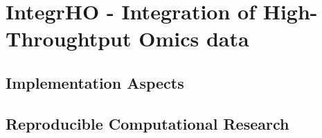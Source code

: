 \documentclass[b5paper,oneside,british,intoc,bibliograph=totoc,index=totoc,BCOR10mm,twoside,openright]{book}
\numberwithin{equation}{section}
\numberwithin{figure}{section}
\begin{document}
\chapter{IntegrHO - Integration of High-Throughtput Omics data} \label{sec:integrhocap}
%
%
%
%
%
%
%
\section{Implementation Aspects} \label{sec:integrhoimpl}

\section{Reproducible Computational Research} \label{sec:integrhorr}

%
%
\end{document}

